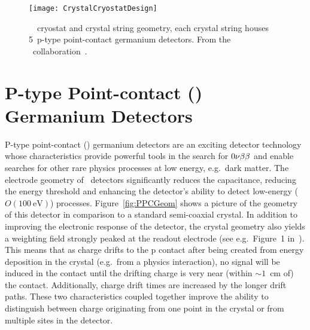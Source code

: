 		\begin{figure}
			\centering		
			\def\figheight{0.45\textheight}
			\texttt{[image: CrystalCryostatDesign]}
			\caption[\MJ~\minmod~cryostat and crystal string geometry]{\MJ~\minmod~cryostat and crystal string geometry, each
			crystal string houses 5~p-type point-contact germanium detectors.  From the \MJ~collaboration~\cite{MJCollaboration}.}
			\label{fig:MJEngDrawing1}
		\end{figure}

	
	\section{P-type Point-contact (\ppc) Germanium Detectors}
	\label{sec:PPCDets}

  P-type point-contact (\ppc) germanium detectors are an exciting detector
technology whose characteristics provide powerful tools in the search for
$0 \nu \beta \beta$ and enable searches for other rare physics processes at low energy, e.g.~dark matter.  
The electrode geometry of \ppc~detectors significantly reduces the
capacitance, reducing the energy threshold and enhancing the detector's
ability to detect low-energy ($O(100~\text{eV})$) processes.  Figure~\ref{fig:PPCGeom} shows a picture of the geometry of this detector in comparison to a standard semi-coaxial crystal.  In addition to improving the electronic response of the detector, the crystal geometry also yields a weighting field strongly peaked at the readout electrode (see e.g.~Figure~1 in~\cite{Ren10}).  This means that as charge drifts to the p contact after being created from energy deposition in the crystal (e.g.~from a physics interaction), no signal will be induced in the contact until the drifting charge is very near (within $\sim1$~cm of) the contact.  Additionally, charge drift times are increased by the longer drift paths.  These two characteristics coupled together improve the ability to distinguish between charge originating from one point in the crystal or from multiple sites in the detector.

